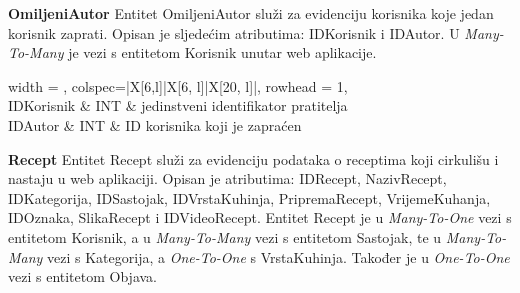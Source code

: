 \vspace{\baselineskip}
\textnormal{\textbf{OmiljeniAutor}		Entitet OmiljeniAutor služi za evidenciju korisnika koje jedan korisnik zaprati. Opisan je sljedećim atributima: IDKorisnik i IDAutor. U \textit{Many-To-Many} je vezi s entitetom Korisnik unutar web aplikacije.}

\begin{longtblr}[
	label=none,
	entry=none
	]{
	width = \textwidth,
	colspec={|X[6,l]|X[6, l]|X[20, l]|},
	rowhead = 1,
	} %
	\hline {}                             \\ \hline[3pt]
	IDKorisnik & INT & jedinstveni identifikator pratitelja \\ \hline
	IDAutor                        & INT & ID korisnika koji je zapraćen        \\ \hline
\end{longtblr}

\vspace{\baselineskip}
\textnormal{\textbf{Recept}		Entitet Recept služi za evidenciju podataka o receptima koji cirkulišu i nastaju u web aplikaciji. Opisan je atributima: IDRecept, NazivRecept, IDKategorija, IDSastojak, IDVrstaKuhinja, PripremaRecept, VrijemeKuhanja, IDOznaka, SlikaRecept i IDVideoRecept. Entitet Recept je u \textit{Many-To-One} vezi s entitetom Korisnik, a u \textit{Many-To-Many} vezi s entitetom Sastojak, te u \textit{Many-To-Many} vezi s Kategorija, a \textit{One-To-One} s VrstaKuhinja. Također je u \textit{One-To-One} vezi s entitetom Objava.}

